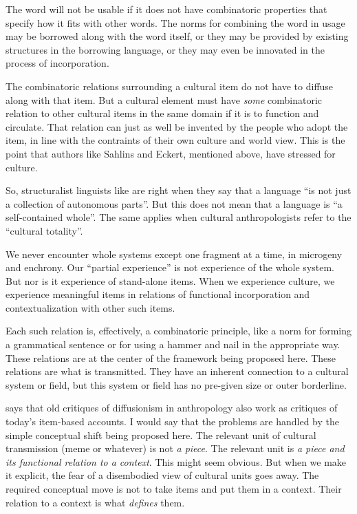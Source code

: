 The word will not be usable if it does not have combinatoric properties that specify how it fits with other words. 
The norms for combining the word in usage may be borrowed along with the 
word itself, or they may be provided by existing structures in the borrowing 
language, or they may even be innovated in the process of incorporation. 



The combinatoric relations surrounding a cultural item 
do not have to diffuse along with that item. But a cultural 
element must have \textit{some} 
combinatoric relation to other cultural items in the same domain if it is to function and circulate. That relation can just as well be invented by the people who adopt the item, in line with the contraints of their own culture and world view. This 
is the point that authors like Sahlins and Eckert, mentioned above, 
have stressed for culture.



So, structuralist linguists like \citet[1]{donegan_rhythm_1983} are right when they 
say that a language ``is not just a collection of autonomous parts''. But
this does not mean that a language is ``a self-contained 
whole''. The same applies when cultural anthropologists 
refer to the ``cultural totality''. 



We never encounter whole systems except one fragment at a time, in microgeny and enchrony. Our 
``partial experience'' \citep[191]{le_page_acts_1985} is not 
experience of the whole system. But nor is it experience of stand-alone 
items. When we experience culture, we experience meaningful items in 
relations of functional incorporation and contextualization with other 
such items. 


Each such relation is, effectively, a combinatoric principle, like a 
norm for forming a grammatical sentence or for using a hammer and nail 
in the appropriate way. These relations are at the center of the 
framework being proposed here. These relations are what is transmitted. 
They have an inherent connection to a cultural system or field, 
but this system or field has no pre-given size or outer borderline.



\citet{bloch_well-disposed_2000} says that old critiques of diffusionism in anthropology 
also work as critiques of today's item-based accounts. I would say that 
the problems are handled by the simple conceptual shift 
being proposed here. The relevant unit of cultural transmission (meme or 
whatever) is not \textit{a piece}. The relevant unit is \textit{a piece and its 
functional relation to a context}. This might seem obvious. But when we 
make it explicit, the fear of a disembodied view of cultural units goes 
away. The required conceptual move is not to take 
items and put them in a context. Their relation to a context is what \textit{defines} them. 



